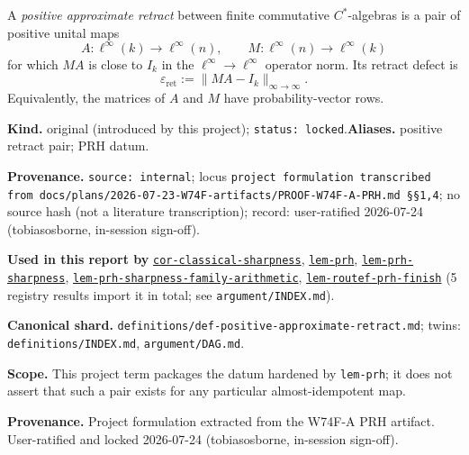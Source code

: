 \hypertarget{def:positive-approximate-retract}{}%
\begin{definition}\label{def:positive-approximate-retract}
A \emph{positive approximate retract} between finite commutative
$C^*$-algebras is a pair of positive unital maps
\[
A:\ell^\infty(k)\longrightarrow\ell^\infty(n),
\qquad
M:\ell^\infty(n)\longrightarrow\ell^\infty(k)
\]
for which $MA$ is close to $I_k$ in the
$\ell^\infty\!\to\!\ell^\infty$ operator norm.  Its retract defect is
\[
\varepsilon_{\mathrm{ret}}:=\lVert MA-I_k\rVert_{\infty\to\infty}.
\]
Equivalently, the matrices of $A$ and $M$ have probability-vector rows.
\end{definition}
\begin{defnote}
\textbf{Kind.} original (introduced by this project); \texttt{status: locked}.\quad\textbf{Aliases.} positive retract pair; PRH datum.
\par
\textbf{Provenance.} \texttt{source: internal}; locus \texttt{project formulation transcribed from docs/\allowbreak{}plans/\allowbreak{}2026-\allowbreak{}07-\allowbreak{}23-\allowbreak{}W74F-\allowbreak{}artifacts/\allowbreak{}PROOF-\allowbreak{}W74F-\allowbreak{}A-\allowbreak{}PRH.\allowbreak{}md \S{}\S{}1,\allowbreak{}4}; no source hash (not a literature transcription); record: user-\allowbreak{}ratified 2026-\allowbreak{}07-\allowbreak{}24 (tobiasosborne,\allowbreak{} in-\allowbreak{}session sign-\allowbreak{}off).
\par
\textbf{Used in this report by} \hyperref[cor:classical-sharpness]{\texttt{cor-\allowbreak{}classical-\allowbreak{}sharpness}}, \hyperref[lem:prh]{\texttt{lem-\allowbreak{}prh}}, \hyperref[lem:prh-sharpness]{\texttt{lem-\allowbreak{}prh-\allowbreak{}sharpness}}, \hyperref[lem:prh-sharpness-family-arithmetic]{\texttt{lem-\allowbreak{}prh-\allowbreak{}sharpness-\allowbreak{}family-\allowbreak{}arithmetic}}, \hyperref[lem:routef-prh-finish]{\texttt{lem-\allowbreak{}routef-\allowbreak{}prh-\allowbreak{}finish}} (5 registry results import it in total; see \texttt{argument/INDEX.md}).
\par
\textbf{Canonical shard.} \texttt{definitions/\allowbreak{}def-\allowbreak{}positive-\allowbreak{}approximate-\allowbreak{}retract.\allowbreak{}md}; twins: \texttt{definitions/INDEX.md}, \texttt{argument/DAG.md}.
\par
\textbf{Scope.} This project term packages the datum hardened by \texttt{lem-\allowbreak{}prh}; it
does not assert that such a pair exists for any particular almost-idempotent
map.

\textbf{Provenance.} Project formulation extracted from the W74F-A PRH artifact.
User-ratified and locked 2026-07-24 (tobiasosborne, in-session sign-off).
\end{defnote}

